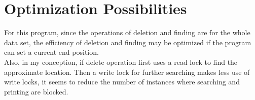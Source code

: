 \section{Optimization Possibilities}
\label{chap:Optimization possibilities}
For this program, since the operations of deletion and finding are for the whole data set, the efficiency of deletion and finding may be optimized if the program can set a current end position. \vspace{8pt}\\
Also, in my conception, if delete operation first uses a read lock to find the approximate location. Then a write lock for further searching makes less use of write locks, it seems to reduce the number of instances where searching and printing are blocked.